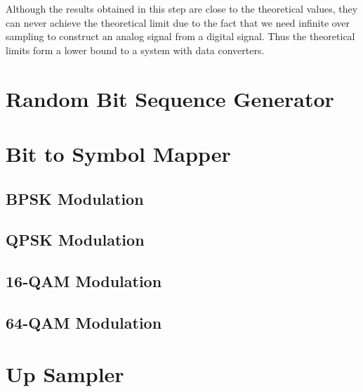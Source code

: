 \documentclass[]{article}
\begin{document}
Although the results obtained in this step are close to the theoretical values, they can never achieve the theoretical limit due to the fact that we need infinite over sampling to construct an analog signal from a digital signal. Thus the theoretical limits form a lower bound to a system with data converters.  

\appendix
\newpage


\newpage
%

\section{Random Bit Sequence Generator}
\label{app:random_bit_generator}


\section{Bit to Symbol Mapper}
\label{app:bittosym}
\subsection{BPSK Modulation}
\label{app:bpsk_mod}


\subsection{QPSK Modulation}
\label{app:qpsk_mod}


\subsection{16-QAM Modulation}
\label{app:qam16_mod}


\subsection{64-QAM Modulation}
\label{app:qam64_mod}


\section{Up Sampler}
\label{app:impulse_train}

\end{document}

